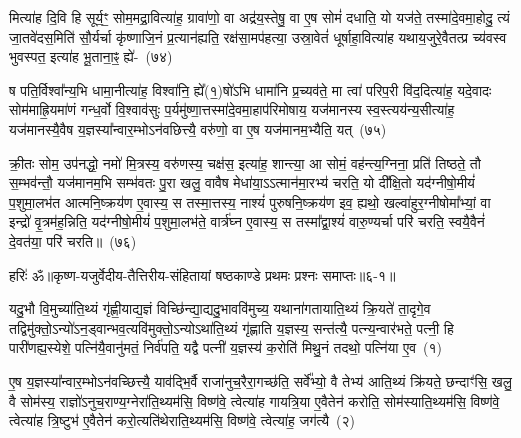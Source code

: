 मित्या॑ह दि॒वि हि सूर्य॒ꣳ॒ सोम॒मद्रा॒वित्या॑ह॒ ग्रावा॑णो॒ वा अद्र॑य॒स्तेषु॒ वा ए॒ष सोमं॑ दधाति॒ यो यज॑ते॒ तस्मा॑दे॒वमा॒होदु॒ त्यं जा॒तवे॑दस॒मिति॑ सौ॒र्यर्चा कृ॑ष्णाजि॒नं प्र॒त्यान॑ह्यति॒ रक्ष॑सा॒मप॑हत्या॒ उस्रा॒वेतं॑ धूर्\mbox{}षाहा॒वित्या॑ह यथाय॒जुरे॒वैतत्प्र च्य॑वस्व भुवस्पत॒ इत्या॑ह भू॒ताना॒ꣴ॒ ह्ये॑-~(७४)\ip

ष पति॒र्विश्वा᳚न्य॒भि धामा॒नीत्या॑ह॒ विश्वा॑नि॒ ह्ये᳚(१॒)षो॑\-ऽभि धामा॑नि प्र॒च्यव॑ते॒ मा त्वा॑ परिप॒री वि॑द॒दित्या॑ह॒ यदे॒वादः सोम॑माह्रि॒यमा॑णं गन्ध॒र्वो वि॒श्वाव॑सुः प॒र्यमु॑ष्णा॒त्तस्मा॑दे॒वमा॒हाप॑रिमोषाय॒ यज॑मानस्य स्व॒स्त्यय॑न्य॒सीत्या॑ह॒ यज॑मानस्यै॒वैष य॒ज्ञस्या᳚न्वार॒म्भो\-ऽन॑वछित्त्यै॒ वरु॑णो॒ वा ए॒ष यज॑मानम॒भ्यैति॒ यत्~(७५)\ip

क्री॒तः सोम॒ उप॑नद्धो॒ नमो॑ मि॒त्रस्य॒ वरु॑णस्य॒ चक्ष॑स॒ इत्या॑ह॒ शान्त्या॒ आ सोमं॒ वह॑न्त्य॒ग्निना॒ प्रति॑ तिष्ठते॒ तौ स॒म्भव॑न्तौ॒ यज॑मानम॒भि सम्भ॑वतः पु॒रा खलु॒ वावैष मेधा॑या॒\-ऽऽत्मान॑मा॒रभ्य॑ चरति॒ यो दी᳚क्षि॒तो यद॑ग्नीषो॒मीयं॑ प॒शुमा॒लभ॑त आत्मनि॒ष्क्रय॑ण ए॒वास्य॒ स तस्मा॒त्तस्य॒ नाश्यं॑ पुरुषनि॒ष्क्रय॑ण इव॒ ह्यथो॒ खल्वा॑हुर॒ग्नी\-षोमा᳚भ्यां॒ वा इन्द्रो॑ वृ॒त्रम॑ह॒न्निति॒ यद॑ग्नीषो॒मीयं॑ प॒शुमा॒लभ॑ते॒ वार्त्र॑घ्न ए॒वास्य॒ स तस्मा᳚द्\-वा॒श्यं॑ वारु॒ण्यर्चा परि॑ चरति॒ स्वयै॒वैनं॑ दे॒वत॑या॒ परि॑ चरति॥~(७६)\ip

{\anuvakamend[{अ॒न्वा॒रभ्योथ्सर्वा॑भिरे॒व सूर्यं॑ भू॒ताना॒ꣴ॒ ह्ये॑ति॒ यदा॑हुः स॒प्तविꣳ॑शतिश्च}]}%

{हरिः॑ ॐ}{॥कृष्ण-यजुर्वेदीय-तैत्तिरीय-संहितायां षष्ठकाण्डे प्रथमः प्रश्नः समाप्तः॥६-१॥}



\setcounter{anuvakam}{0}
यदु॒भौ वि॒मुच्या॑ति॒थ्यं गृ॑ह्णी॒याद्य॒ज्ञं विच्छि॑न्द्या॒द्यदु॒भाववि॑मुच्य॒ यथाना॑गतायाति॒थ्यं क्रि॒यते॑ ता॒दृगे॒व तद्विमु॑क्तो॒\-ऽन्यो॑\-ऽन॒ड्वान्भव॒त्यवि॑मुक्तो॒\-ऽन्यो\-ऽथा॑ति॒थ्यं गृ॑ह्णाति य॒ज्ञस्य॒ सन्त॑त्यै॒ पत्न्य॒न्वार॑भते॒ पत्नी॒ हि पारी॑णह्य॒स्येशे॒ पत्नि॑यै॒वानु॑मतं॒ निर्व॑पति॒ यद्वै पत्नी॑ य॒ज्ञस्य॑ क॒रोति॑ मिथु॒नं तदथो॒ पत्नि॑या ए॒व~(१)\ip

ए॒ष य॒ज्ञस्या᳚न्वार॒म्भो\-ऽन॑वच्छित्त्यै॒ याव॑द्भि॒र्वै राजा॑नुच॒रैरा॒गच्छ॑ति॒ सर्वे᳚भ्यो॒ वै तेभ्य॑ आति॒थ्यं क्रि॑यते॒ छन्दाꣳ॑सि॒ खलु॒ वै सोम॑स्य॒ राज्ञो॑\-ऽनुच॒राण्य॒ग्नेरा॑ति॒थ्यम॑सि॒ विष्ण॑वे॒ त्वेत्या॑ह गायत्रि॒या ए॒वैतेन॑ करोति॒ सोम॑स्याति॒थ्यम॑सि॒ विष्ण॑वे॒ त्वेत्या॑ह त्रि॒ष्टुभ॑ ए॒वैतेन॑ करो॒त्यति॑थेराति॒थ्यम॑सि॒ विष्ण॑वे॒ त्वेत्या॑ह॒ जग॑त्यै~(२)\ip

